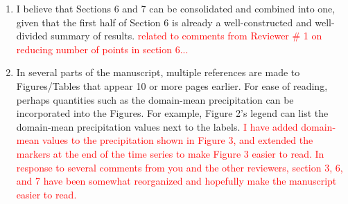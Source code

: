 \documentclass[draft]{agujournal2019}
\begin{document}
\begin{enumerate}
  \item I believe that Sections 6 and 7 can be consolidated and combined into one, given that the first half of Section 6 is already a well-constructed and well-divided summary of results.
  \textcolor{red}{related to comments from Reviewer \# 1 on reducing number of points in section 6...}
  \item In several parts of the manuscript, multiple references are made to Figures/Tables that appear 10 or more pages earlier. For ease of reading, perhaps quantities such as the domain-mean precipitation can be incorporated into the Figures. For example, Figure 2's legend can list the domain-mean precipitation values next to the labels.
  \textcolor{red}{I have added domain-mean values to the precipitation shown in Figure 3, and extended the markers at the end of the time series to make Figure 3 easier to read.  
  In response to several comments from you and the other reviewers, section 3, 6, and 7 have been somewhat reorganized and hopefully make the manuscript easier to read.}
\end{enumerate}
\end{document}
